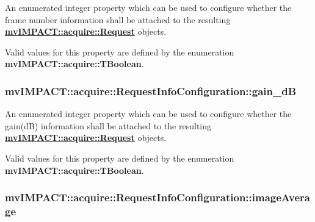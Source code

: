 An enumerated integer property which can be used to configure whether the frame number information shall be attached to the resulting {\bfseries \hyperlink{classmv_i_m_p_a_c_t_1_1acquire_1_1_request}{mv\+I\+M\+P\+A\+C\+T\+::acquire\+::\+Request}} objects. 

Valid values for this property are defined by the enumeration {\bfseries mv\+I\+M\+P\+A\+C\+T\+::acquire\+::\+T\+Boolean}. \hypertarget{classmv_i_m_p_a_c_t_1_1acquire_1_1_request_info_configuration_a74da6fdc9ad3e5c77874fa02ff7a8409}{
\subsubsection[{gain\+\_\+d\+B}]{ mv\+I\+M\+P\+A\+C\+T\+::acquire\+::\+Request\+Info\+Configuration\+::gain\+\_\+d\+B}}\label{classmv_i_m_p_a_c_t_1_1acquire_1_1_request_info_configuration_a74da6fdc9ad3e5c77874fa02ff7a8409}


An enumerated integer property which can be used to configure whether the gain(d\+B) information shall be attached to the resulting {\bfseries \hyperlink{classmv_i_m_p_a_c_t_1_1acquire_1_1_request}{mv\+I\+M\+P\+A\+C\+T\+::acquire\+::\+Request}} objects. 

Valid values for this property are defined by the enumeration {\bfseries mv\+I\+M\+P\+A\+C\+T\+::acquire\+::\+T\+Boolean}. \hypertarget{classmv_i_m_p_a_c_t_1_1acquire_1_1_request_info_configuration_a89dcb6d89e7c15d6fcc203e4aa69b849}{
\subsubsection[{image\+Average}]{ mv\+I\+M\+P\+A\+C\+T\+::acquire\+::\+Request\+Info\+Configuration\+::image\+Average}}\label{classmv_i_m_p_a_c_t_1_1acquire_1_1_request_info_configuration_a89dcb6d89e7c15d6fcc203e4aa69b849}



